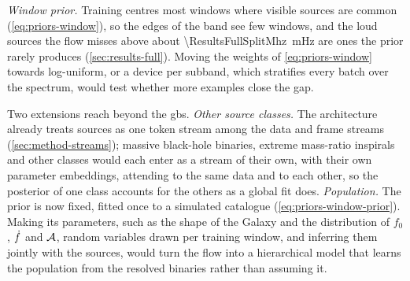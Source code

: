 \emph{Window prior.} Training centres most windows where visible sources are common
(\cref{eq:priors-window}), so the edges of the band see few windows, and the loud sources the flow
misses above about \qty{\ResultsFullSplitMhz}{\milli\hertz} are ones the prior rarely produces
(\cref{sec:results-full}). Moving the weights of \cref{eq:priors-window} towards log-uniform, or a
device per subband, which stratifies every batch over the spectrum, would test whether more
examples close the gap.

Two extensions reach beyond the \acp{gb}. \emph{Other source classes.} The architecture already
treats sources as one token stream among the data and frame streams
(\cref{sec:method-streams}); massive black-hole binaries, extreme mass-ratio inspirals and other
classes would each enter as a stream of their own, with their own parameter embeddings, attending
to the same data and to each other, so the posterior of one class accounts for the others as a
global fit does. \emph{Population.} The prior is now fixed, fitted once to a simulated catalogue
(\cref{eq:priors-window-prior}). Making its parameters, such as the shape of the Galaxy and the
distribution of $f_0$, $\dot f$ and $\mathcal{A}$, random variables drawn per training window, and inferring
them jointly with the sources, would turn the flow into a hierarchical model that learns the
population from the resolved binaries rather than assuming it.
